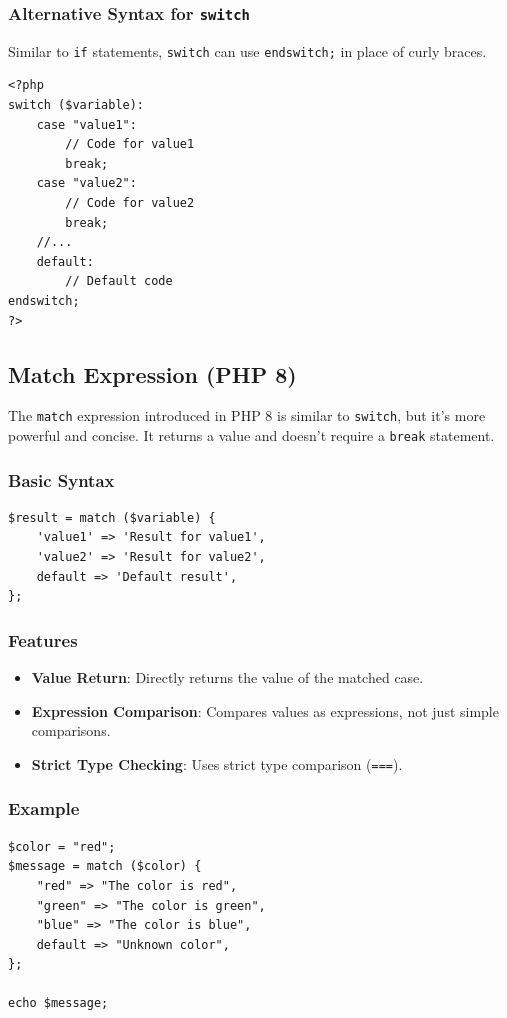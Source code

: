\documentclass[11pt]{article}
\begin{document}
\subsubsection{Alternative Syntax for \texttt{switch}}
\label{sec:org363f242}
Similar to \texttt{if} statements, \texttt{switch} can use \texttt{endswitch;} in place of
curly braces.

\begin{verbatim}
<?php
switch ($variable):
    case "value1":
        // Code for value1
        break;
    case "value2":
        // Code for value2
        break;
    //...
    default:
        // Default code
endswitch;
?>
\end{verbatim}

\subsection{Match Expression (PHP 8)}
\label{sec:org30f9710}
The \texttt{match} expression introduced in PHP 8 is similar to \texttt{switch}, but
it's more powerful and concise. It returns a value and doesn't require a
\texttt{break} statement.

\subsubsection{Basic Syntax}
\label{sec:org76c0a5e}
\begin{verbatim}
$result = match ($variable) {
    'value1' => 'Result for value1',
    'value2' => 'Result for value2',
    default => 'Default result',
};
\end{verbatim}

\subsubsection{Features}
\label{sec:orgea4ac10}
\begin{itemize}
\item \textbf{Value Return}: Directly returns the value of the matched case.
\item \textbf{Expression Comparison}: Compares values as expressions, not just
simple comparisons.
\item \textbf{Strict Type Checking}: Uses strict type comparison (\texttt{===}).
\end{itemize}

\subsubsection{Example}
\label{sec:orgca07d00}
\begin{verbatim}
$color = "red";
$message = match ($color) {
    "red" => "The color is red",
    "green" => "The color is green",
    "blue" => "The color is blue",
    default => "Unknown color",
};

echo $message;
\end{verbatim}
\end{document}
